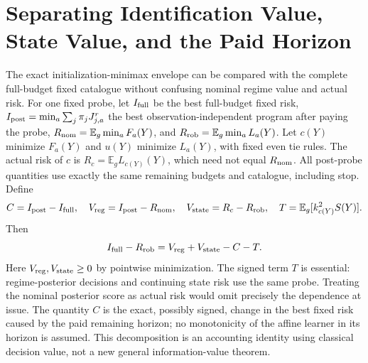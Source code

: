\section{Separating Identification Value, State Value, and the Paid Horizon}
The exact initialization-minimax envelope can be compared with the complete
full-budget fixed catalogue without confusing nominal regime value and actual risk.
For one fixed probe, let $I_{\rm full}$ be the best full-budget fixed risk,
$I_{\rm post}=\min_a\sum_j\pi_jJ_{j,a}^{r}$ the best observation-independent
program after paying the probe, $R_{\rm nom}=\mathbb E_g\min_aF_a(Y)$,
and $R_{\rm rob}=\mathbb E_g\min_aL_a(Y)$.
Let $c(Y)$ minimize $F_a(Y)$ and $u(Y)$ minimize $L_a(Y)$, with fixed even tie
rules. The actual risk of $c$ is $R_c=\mathbb E_gL_{c(Y)}(Y)$, which need not
equal $R_{\rm nom}$.
All post-probe quantities use exactly the same remaining budgets and catalogue,
including stop.
Define
\[
C=I_{\rm post}-I_{\rm full},\quad
V_{\rm reg}=I_{\rm post}-R_{\rm nom},\quad
V_{\rm state}=R_c-R_{\rm rob},\quad
T=\mathbb E_g[k_{c(Y)}^2S(Y)].
\]
Then
\begin{equation}
I_{\rm full}-R_{\rm rob}=V_{\rm reg}+V_{\rm state}-C-T.
\label{eq:research-value-decomposition}
\end{equation}
Here $V_{\rm reg},V_{\rm state}\ge0$ by pointwise minimization.
The signed term $T$ is essential: regime-posterior decisions and continuing
state risk use the same probe. Treating the nominal posterior score as actual
risk would omit precisely the dependence at issue.
The quantity $C$ is the exact, possibly signed, change in the best
fixed risk caused by the paid remaining horizon; no monotonicity of the affine
learner in its horizon is assumed.
This decomposition is an accounting identity using classical decision value,
not a new general information-value theorem.


